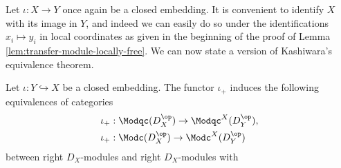 Let $\iota:X\to Y$ once again be a closed embedding. It is convenient to identify $X$ with its image in $Y$, and indeed we can easily do so under the identifications $x_i\mapsto y_i$ in local coordinates as given in the beginning of the proof of Lemma \ref{lem:transfer-module-locally-free}. We can now state a version of Kashiwara's equivalence theorem.
\begin{thm}\label{thm:kashiwara}
	Let $\iota:Y\hookrightarrow X$ be a closed embedding. The functor $\iota_+$ induces the following equivalences of categories
	\begin{align*}
		\iota_+&:\Modqc(D_X^{\op}) \to \Modqc^X(D_Y^{\op}), \\
		\iota_+&:\Modc(D_X^{\op}) \to \Modc^X(D_Y^{\op})
	\end{align*}
	between right $D_X$-modules and right $D_X$-modules with 
\end{thm}
